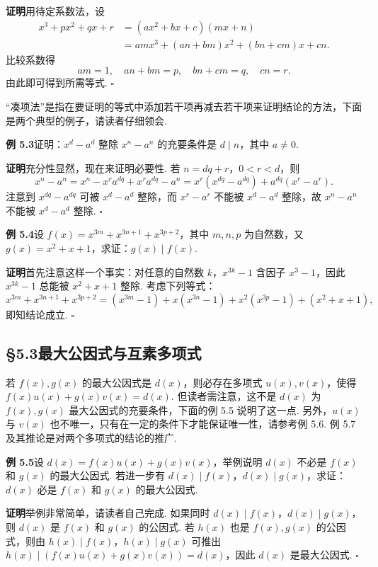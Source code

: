 \documentclass[UTF8, 12pt, fontset=fandol, oneside]{ctexart}
\begin{document}
\noindent\textbf{证明}\quad 用待定系数法，设
\[
\begin{aligned}
x^3+px^2+qx+r
&=(ax^2+bx+c)(mx+n)\\
&=amx^3+(an+bm)x^2+(bn+cm)x+cn.
\end{aligned}
\]
比较系数得
\[
am=1,\quad an+bm=p,\quad bn+cm=q,\quad cn=r.
\]
由此即可得到所需等式. \hfill $\square$

``凑项法''是指在要证明的等式中添加若干项再减去若干项来证明结论的方法，下面是两个典型的例子，请读者仔细领会.

\noindent\textbf{例 5.3}\quad 证明：$x^d-a^d$ 整除 $x^n-a^n$ 的充要条件是 $d\mid n$，其中 $a\ne0$.

\noindent\textbf{证明}\quad 充分性显然，现在来证明必要性. 若 $n=dq+r$，$0<r<d$，则
\[
x^n-a^n=x^n-x^ra^{dq}+x^ra^{dq}-a^n
=x^r(x^{dq}-a^{dq})+a^{dq}(x^r-a^r).
\]
注意到 $x^{dq}-a^{dq}$ 可被 $x^d-a^d$ 整除，而 $x^r-a^r$ 不能被 $x^d-a^d$ 整除，故 $x^n-a^n$ 不能被 $x^d-a^d$ 整除. \hfill $\square$

\noindent\textbf{例 5.4}\quad 设 $f(x)=x^{3m}+x^{3n+1}+x^{3p+2}$，其中 $m,n,p$ 为自然数，又 $g(x)=x^2+x+1$，求证：$g(x)\mid f(x)$.

\noindent\textbf{证明}\quad 首先注意这样一个事实：对任意的自然数 $k$，$x^{3k}-1$ 含因子 $x^3-1$，因此 $x^{3k}-1$ 总能被 $x^2+x+1$ 整除. 考虑下列等式：
\[
x^{3m}+x^{3n+1}+x^{3p+2}
=(x^{3m}-1)+x(x^{3n}-1)+x^2(x^{3p}-1)+(x^2+x+1),
\]
即知结论成立. \hfill $\square$

\subsection*{§5.3\quad 最大公因式与互素多项式}

若 $f(x),g(x)$ 的最大公因式是 $d(x)$，则必存在多项式 $u(x),v(x)$，使得 $f(x)u(x)+g(x)v(x)=d(x)$. 但读者需注意，这不是 $d(x)$ 为 $f(x),g(x)$ 最大公因式的充要条件，下面的例 5.5 说明了这一点. 另外，$u(x)$ 与 $v(x)$ 也不唯一，只有在一定的条件下才能保证唯一性，请参考例 5.6. 例 5.7 及其推论是对两个多项式的结论的推广.

\noindent\textbf{例 5.5}\quad 设 $d(x)=f(x)u(x)+g(x)v(x)$，举例说明 $d(x)$ 不必是 $f(x)$ 和 $g(x)$ 的最大公因式. 若进一步有 $d(x)\mid f(x)$，$d(x)\mid g(x)$，求证：$d(x)$ 必是 $f(x)$ 和 $g(x)$ 的最大公因式.

\noindent\textbf{证明}\quad 举例非常简单，请读者自己完成. 如果同时 $d(x)\mid f(x)$，$d(x)\mid g(x)$，则 $d(x)$ 是 $f(x)$ 和 $g(x)$ 的公因式. 若 $h(x)$ 也是 $f(x),g(x)$ 的公因式，则由 $h(x)\mid f(x)$，$h(x)\mid g(x)$ 可推出 $h(x)\mid (f(x)u(x)+g(x)v(x))=d(x)$，因此 $d(x)$ 是最大公因式. \hfill $\square$
\end{document}
